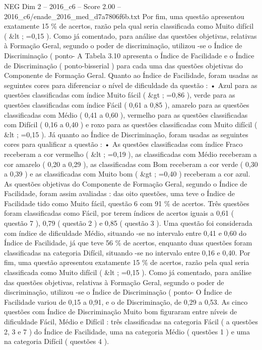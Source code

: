 \begin{textsample}{NEG Dim 2 – 2016\_c6 – Score 2.00 – 2016\_c6/enade\_2016\_med\_d7a7806f6b.txt}
Por fim, uma questão apresentou exatamente 15 \% de acertos, razão pela qual seria classificada como Muito difícil ( \&lt ; =0,15 ).
Como já comentado, para análise das questões objetivas, relativas à Formação Geral, segundo o poder de discriminação, utilizou -se o Índice de Discriminação ( ponto- A Tabela 3.10 apresenta o Índice de Facilidade e o Índice de Discriminação ( ponto-bisserial ) para cada uma das questões objetivas do Componente de Formação Geral.
Quanto ao Índice de Facilidade, foram usadas as seguintes cores para diferenciar o nível de dificuldade da questão : • Azul para as questões classificadas com índice Muito fácil ( \&gt ; =0,86 ), verde para as questões classificadas com índice Fácil ( 0,61 a 0,85 ), amarelo para as questões classificadas com Médio ( 0,41 a 0,60 ), vermelho para as questões classificadas com Difícil ( 0,16 a 0,40 ) e roxo para as questões classificadas com Muito difícil ( \&lt ; =0,15 ).
Já quanto ao Índice de Discriminação, foram usadas as seguintes cores para qualificar a questão : • As questões classificadas com índice Fraco receberam a cor vermelho ( \&lt ; =0,19 ), as classificadas com Médio receberam a cor amarelo ( 0,20 a 0,29 ), as classificadas com Bom receberam a cor verde ( 0,30 a 0,39 ) e as classificadas com Muito bom ( \&gt ; =0,40 ) receberam a cor azul.
As questões objetivas do Componente de Formação Geral, segundo o Índice de Facilidade, foram assim avaliadas : das oito questões, uma teve o Índice de Facilidade tido como Muito fácil, questão 6 com 91 \% de acertos.
Três questões foram classificadas como Fácil, por terem índices de acertos iguais a 0,61 ( questão 7 ), 0,79 ( questão 2 ) e 0,85 ( questão 3 ).
Uma questão foi considerada com índice de dificuldade Médio, situando -se no intervalo entre 0,41 e 0,60 do Índice de Facilidade, já que teve 56 \% de acertos, enquanto duas questões foram classificadas na categoria Difícil, situando -se no intervalo entre 0,16 e 0,40.
Por fim, uma questão apresentou exatamente 15 \% de acertos, razão pela qual seria classificada como Muito difícil ( \&lt ; =0,15 ).
Como já comentado, para análise das questões objetivas, relativas à Formação Geral, segundo o poder de discriminação, utilizou -se o Índice de Discriminação ( ponto- O Índice de Facilidade variou de 0,15 a 0,91, e o de Discriminação, de 0,29 a 0,53.
As cinco questões com Índice de Discriminação Muito bom figuraram entre níveis de dificuldade Fácil, Médio e Difícil : três classificadas na categoria Fácil ( a questões 2, 3 e 7 ) do Índice de Facilidade, uma na categoria Médio ( questões 1 ) e uma na categoria Difícil ( questões 4 ).

\end{textsample}
